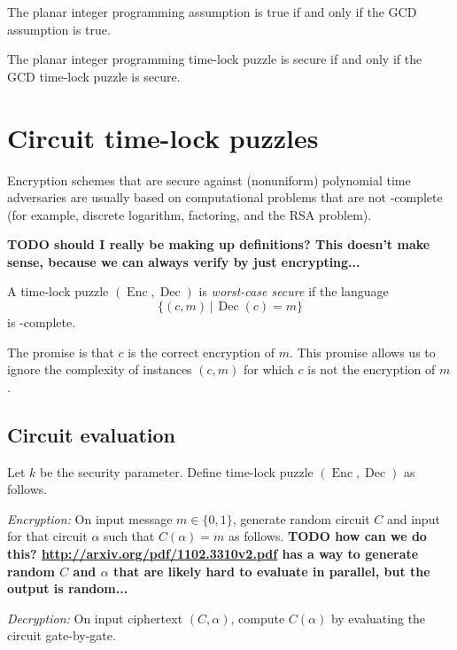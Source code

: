 \documentclass{article}
\newcommand{\todo}[1]{\textbf{TODO #1}}
\newcommand{\Enc}{\operatorname{Enc}}
\newcommand{\Dec}{\operatorname{Dec}}
\newcommand{\Piy}{\Pi_{yes}}
\newcommand{\Pin}{\Pi_{no}}
\begin{document}
\begin{conjecture}
  The planar integer programming assumption is true if and only if the GCD assumption is true.
\end{conjecture}

\begin{conjecture}
  The planar integer programming time-lock puzzle is secure if and only if the GCD time-lock puzzle is secure.
\end{conjecture}

\section{Circuit time-lock puzzles}

Encryption schemes that are secure against (nonuniform) polynomial time adversaries are usually based on computational problems that are not \NP-complete (for example, discrete logarithm, factoring, and the RSA problem).

\begin{definition}
  \todo{should I really be making up definitions? This doesn't make sense, because we can always verify by just encrypting...}


  A time-lock puzzle $(\Enc, \Dec)$ is \emph{worst-case secure} if the language
  $$
  \{ (c, m) \, | \, \Dec(c) = m \}
  $$
  is \prP-complete.
\end{definition}
The promise is that $c$ is the correct encryption of $m$.
This promise allows us to ignore the complexity of instances $(c, m)$ for which $c$ is not the encryption of $m$.

\subsection{Circuit evaluation}

\begin{protocol}
  Let $k$ be the security parameter.
  Define time-lock puzzle $(\Enc, \Dec)$ as follows.

  \emph{Encryption:} On input message $m \in \{0, 1\}$, generate random circuit $C$ and input for that circuit $\alpha$ such that $C(\alpha) = m$ as follows.
  \todo{how can we do this? \url{http://arxiv.org/pdf/1102.3310v2.pdf} has a way to generate random $C$ and $\alpha$ that are likely hard to evaluate in parallel, but the output is random...}

  \emph{Decryption:} On input ciphertext $(C, \alpha)$, compute $C(\alpha)$ by evaluating the circuit gate-by-gate.
\end{protocol}
\end{document}
